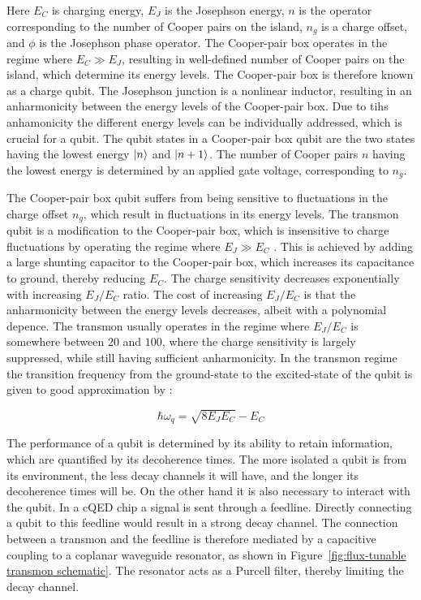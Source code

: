       Here $E_C$ is charging energy, $E_J$ is the Josephson energy, $n$ is the operator corresponding to the number of Cooper pairs on the island, $n_g$ is a charge offset, and $\phi$ is the Josephson phase operator. The Cooper-pair box operates in the regime where $E_C \gg E_J$, resulting in well-defined number of Cooper pairs on the island, which determine its energy levels. The Cooper-pair box is therefore known as a charge qubit. The Josephson junction is a nonlinear inductor, resulting in an anharmonicity between the energy levels of the Cooper-pair box. Due to tihs anhamonicity the different energy levels can be individually addressed, which is crucial for a qubit. The qubit states in a Cooper-pair box qubit are the two states having the lowest energy $\ket{n}$ and $\ket{n+1}$. The number of Cooper pairs $n$ having the lowest energy is determined by an applied gate voltage, corresponding to $n_g$.

      The Cooper-pair box qubit suffers from being sensitive to fluctuations in the charge offset $n_g$, which result in fluctuations in its energy levels. The transmon qubit is a modification to the Cooper-pair box, which is insensitive to charge fluctuations by operating the regime where $E_J \gg E_C$ \cite{koch2007Transmon,schreier2008suppressing}. This is achieved by adding a large shunting capacitor to the Cooper-pair box, which increases its capacitance to ground, thereby reducing $E_C$. The charge sensitivity decreases exponentially with increasing $E_J/E_C$ ratio. The cost of increasing $E_J/E_C$ is that the anharmonicity between the energy levels decreases, albeit with a polynomial depence. The transmon usually operates in the regime where $E_J/E_C$ is somewhere between $20$ and $100$, where the charge sensitivity is largely suppressed, while still having sufficient anharmonicity. In the transmon regime the transition frequency from the ground-state to the excited-state of the qubit is given to good approximation by \cite[p.52]{Reed}:

      \begin{equation}
        \hbar \omega_q = \sqrt{8 E_J E_C} - E_C
        \label{eq:transmon frequency}
      \end{equation}

      The performance of a qubit is determined by its ability to retain information, which are quantified by its decoherence times. The more isolated a qubit is from its environment, the less decay channels it will have, and the longer its decoherence times will be. On the other hand it is also necessary to interact with the qubit. In a cQED chip a signal is sent through a feedline. Directly connecting a qubit to this feedline would result in a strong decay channel. The connection between a transmon and the feedline is therefore mediated by a capacitive coupling to a coplanar waveguide resonator, as shown in Figure~\ref{fig:flux-tunable transmon schematic}. The resonator acts as a Purcell filter, thereby limiting the decay channel.

